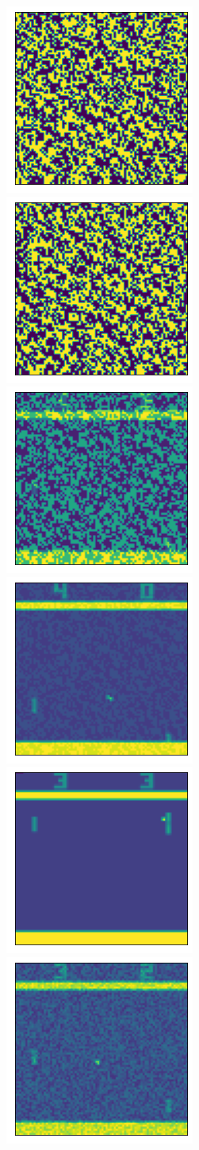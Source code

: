 \begin{figure}
  \centering
  \subcaptionbox{\label{fig:subfig-a}}
    {\includegraphics[width=0.19\linewidth]{images/noise/PongNoFrameskip-v4_gsm_ppo_eps_0.1.png}}
  \subcaptionbox{\label{fig:subfig-b}}
    {\includegraphics[width=0.19\linewidth]{images/noise/PongNoFrameskip-v4_gsm_ppo_eps_0.01.png}}
    \subcaptionbox{\label{fig:subfig-c}}
    {\includegraphics[width=0.19\linewidth]{images/noise/PongNoFrameskip-v4_gsm_ppo_eps_0.001.png}}
    \subcaptionbox{\label{fig:subfig-d}}
    {\includegraphics[width=0.19\linewidth]{images/noise/PongNoFrameskip-v4_gsm_ppo_eps_0.0001.png}}
    \subcaptionbox{\label{fig:subfig-e}}
    {\includegraphics[width=0.19\linewidth]{images/noise/PongNoFrameskip-v4_gsm_ppo_eps_0.1_ori.png}}
    \subcaptionbox{\label{fig:subfig-f}}
    {\includegraphics[width=0.19\linewidth]{images/noise/PongNoFrameskip-v4_pgda_ppo_eps_0.1.png}}

\end{figure}
